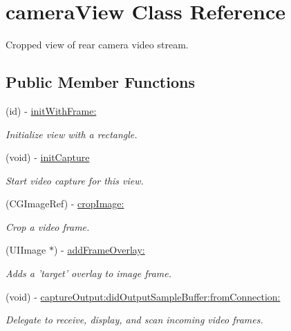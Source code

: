 \hypertarget{interfacecamera_view}{
\section{cameraView Class Reference}
\label{interfacecamera_view}
}


Cropped view of rear camera video stream.  


\subsection*{Public Member Functions}
\begin{DoxyCompactItemize}
\item 
(id) -\/ \hyperlink{interfacecamera_view_a2c60d41fcd0dc0a17172a1e081a1b47f}{initWithFrame:}
\begin{DoxyCompactList}\small\item\em Initialize view with a rectangle. \end{DoxyCompactList}\item 
(void) -\/ \hyperlink{interfacecamera_view_ae7f3e7153b93817e90d22f0a872a28d1}{initCapture}
\begin{DoxyCompactList}\small\item\em Start video capture for this view. \end{DoxyCompactList}\item 
(CGImageRef) -\/ \hyperlink{interfacecamera_view_a98f6390a43d2e68f9bc68a80a1619754}{cropImage:}
\begin{DoxyCompactList}\small\item\em Crop a video frame. \end{DoxyCompactList}\item 
(UIImage $\ast$) -\/ \hyperlink{interfacecamera_view_a1599e6698d617f02c46fe5ac78cc438d}{addFrameOverlay:}
\begin{DoxyCompactList}\small\item\em Adds a 'target' overlay to image frame. \end{DoxyCompactList}\item 
(void) -\/ \hyperlink{interfacecamera_view_ad02b926ab689e21915abf8cf1a9800cf}{captureOutput:didOutputSampleBuffer:fromConnection:}
\begin{DoxyCompactList}\small\item\em Delegate to receive, display, and scan incoming video frames. \end{DoxyCompactList}\end{DoxyCompactItemize}
